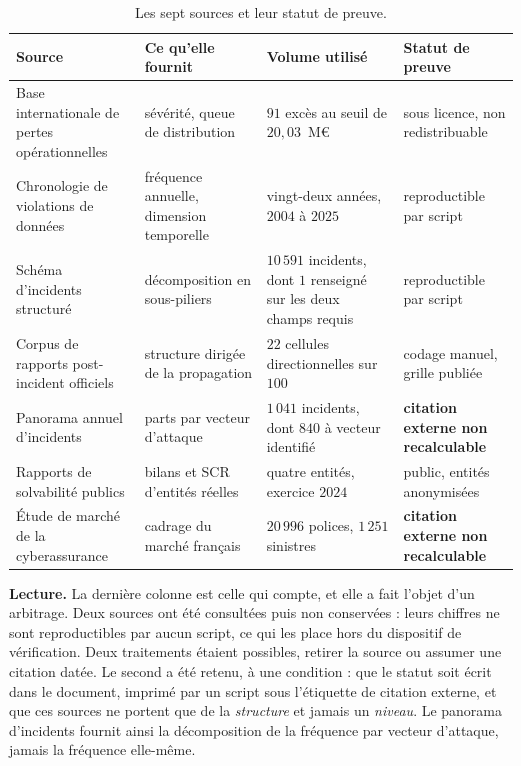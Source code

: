 \documentclass[12pt,a4paper]{article}
\theoremstyle{definition}
\begin{document}
\begin{table}[htbp]
\centering\small
\renewcommand{\arraystretch}{1.2}
\begin{tabular}{@{}>{\raggedright\arraybackslash}p{3.4cm}>{\raggedright\arraybackslash}p{3.5cm}>{\raggedright\arraybackslash}p{3.5cm}>{\raggedright\arraybackslash}p{3.2cm}@{}}
\toprule
\textbf{Source} & \textbf{Ce qu'elle fournit} & \textbf{Volume utilisé} &
\textbf{Statut de preuve} \\
\midrule
Base internationale de pertes opérationnelles &
sévérité, queue de distribution &
$91$ excès au seuil de $20{,}03$~M\euro &
sous licence, non redistribuable \\
Chronologie de violations de données &
fréquence annuelle, dimension temporelle &
vingt-deux années, $2004$ à $2025$ &
reproductible par script \\
Schéma d'incidents structuré &
décomposition en sous-piliers &
$10\,591$ incidents, dont $1$ renseigné sur les deux champs requis &
reproductible par script \\
Corpus de rapports post-incident officiels &
structure dirigée de la propagation &
$22$ cellules directionnelles sur $100$ &
codage manuel, grille publiée \\
Panorama annuel d'incidents &
parts par vecteur d'attaque &
$1\,041$ incidents, dont $840$ à vecteur identifié &
\textbf{citation externe non recalculable} \\
Rapports de solvabilité publics &
bilans et SCR d'entités réelles &
quatre entités, exercice $2024$ &
public, entités anonymisées \\
Étude de marché de la cyberassurance &
cadrage du marché français &
$20\,996$ polices, $1\,251$ sinistres &
\textbf{citation externe non recalculable} \\
\bottomrule
\end{tabular}
\caption{Les sept sources et leur statut de preuve.}
\label{tab:sources}
\end{table}

\textbf{Lecture.} La dernière colonne est celle qui compte, et elle a fait l'objet
d'un arbitrage. Deux sources ont été consultées puis non conservées : leurs
chiffres ne sont reproductibles par aucun script, ce qui les place hors du
dispositif de vérification. Deux traitements étaient possibles, retirer la source
ou assumer une citation datée. Le second a été retenu, à une condition : que le
statut soit écrit dans le document, imprimé par un script sous l'étiquette de
citation externe, et que ces sources ne portent que de la \emph{structure} et
jamais un \emph{niveau}. Le panorama d'incidents fournit ainsi la décomposition de
la fréquence par vecteur d'attaque, jamais la fréquence elle-même.
\end{document}
